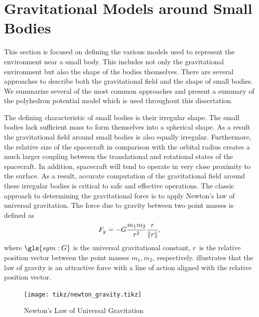 \section{Gravitational Models around Small Bodies}\label{sec:gravitational_models}
This section is focused on defining the various models used to represent the environment near a small body.
This includes not only the gravitational environment but also the shape of the bodies themselves.
There are several approaches to describe both the gravitational field and the shape of small bodies.
We summarize several of the most common approaches and present a summary of the polyhedron potential model which is used throughout this dissertation.

The defining characteristic of small bodies is their irregular shape.
The small bodies lack sufficient mass to form themselves into a spherical shape.
As a result the gravitational field around small bodies is also equally irregular.
Furthermore, the relative size of the spacecraft in comparison with the orbital radius creates a much larger coupling between the translational and rotational states of the spacecraft.
In addition, spacecraft will tend to operate in very close proximity to the surface.
As a result, accurate computation of the gravitational field around these irregular bodies is critical to safe and effective operations.
The classic approach to determining the gravitational force is to apply Newton's law of universal gravitation.
The force due to gravity between two point masses is defined as
\begin{align}\label{eq:newton_universal_gravitation}
    F_g =  - G \frac{m_1 m_2}{r^2} \frac{r}{\left\| r \right\|},
\end{align}
where \( \gls{sym:G} \) is the universal gravitational constant, \( r \) is the relative position vector between the point masses \( m_1, m_2\), respectively.
 illustrates that the law of gravity is an attractive force with a line of action aligned with the relative position vector.
\begin{figure}
    \centering
    \texttt{[image: tikz/newton\_gravity.tikz]}
    \caption{Newton's Law of Universal Gravitation~\label{fig:universal_gravity}}
\end{figure}

